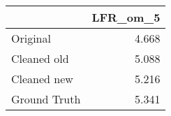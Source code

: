 \begin{tabular}{lr}
\toprule
{} & LFR_om_5 \\
\midrule
Original     &    4.668 \\
Cleaned old  &    5.088 \\
Cleaned new  &    5.216 \\
Ground Truth &    5.341 \\
\bottomrule
\end{tabular}
